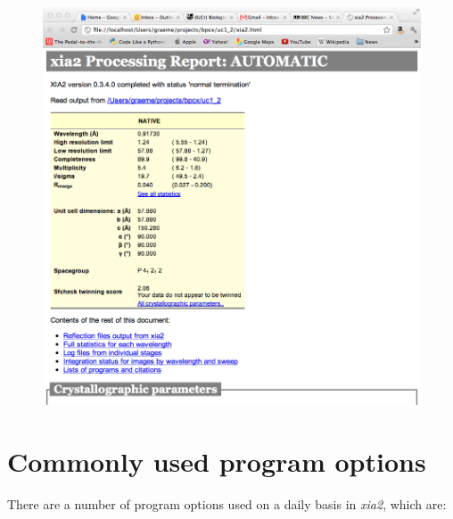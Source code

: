 \documentclass[a4paper, 11pt]{article}
\begin{document}
\begin{figure}
\begin{center}
  \includegraphics[scale=0.4, bb=0 0 1780 1774]{figures/xia2html.png}
\fi
\end{center}
\end{figure}

\section{Commonly used program options}

There are a number of program options used on a daily basis in 
\emph{xia2}, which are:
\end{document}
